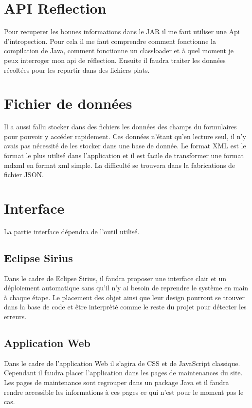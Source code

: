 \section{API Reflection}
Pour recuperer les bonnes informations dans le JAR il me faut utiliser une Api d'intropection. Pour cela il me faut comprendre comment fonctionne la compilation de Java, comment fonctionne un classloader et à quel moment je peux interroger mon api de réflection. Ensuite il faudra traiter les données récoltées pour les repartir dans des fichiers plats.

\section{Fichier de données}
Il a aussi fallu stocker dans des fichiers les données des champs du formulaires pour pouvoir y accéder rapidement. Ces données n'étant qu'en lecture seul, il n'y avais pas nécessité de les stocker dans une base de donnée. Le format XML est le format le plus utilisé dans l'application et il est facile de transformer une format mdxml en format xml simple. La difficulté se trouvera dans la fabrications de fichier JSON.

\section{Interface}
La partie interface dépendra de l'outil utilisé.

\subsection{Eclipse Sirius}
Dans le cadre de Eclipse Sirius, il faudra proposer une interface clair et un déploiement automatique sans qu'il n'y ai besoin de reprendre le système en main à chaque étape. Le placement des objet ainsi que leur design pourront se trouver dans la base de code et être interprèté comme le reste du projet pour détecter les erreurs. 

\subsection{Application Web}
Dans le cadre de l'application Web il s'agira de CSS et de JavaScript classique. Cependant il faudra placer l'application dans les pages de maintenances du site. Les pages de maintenance sont regrouper dans un package Java et il faudra rendre accessible les informations à ces pages ce qui n'est pour le moment pas le cas.

